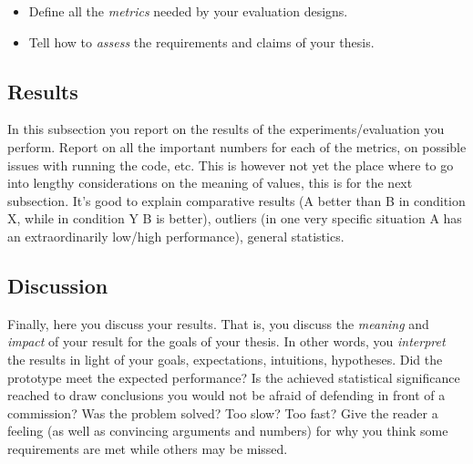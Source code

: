 \begin{itemize}
\item[\Square] Define all the \emph{metrics} needed by your evaluation designs.
\item[\Square] Tell how to \emph{assess} the requirements and claims of your thesis.
\end{itemize}


\subsection{Results}
In this subsection you report on the results of the experiments/evaluation you perform. Report on all the important numbers for each of the metrics, on possible issues with running the code, etc. This is however not yet the place where to go into lengthy considerations on the meaning of values, this is for the next subsection. It's good to explain comparative results (A better than B in condition X, while in condition Y B is better), outliers (in one very specific situation A has an extraordinarily low/high performance), general statistics.

\subsection{Discussion}
Finally, here you discuss your results. That is, you discuss the \emph{meaning} and \emph{impact} of your result for the goals of your thesis. In other words, you \emph{interpret} the results in light of your goals, expectations, intuitions, hypotheses. Did the prototype meet the expected performance? Is the achieved statistical significance reached to draw conclusions you would not be afraid of defending in front of a commission? Was the problem solved? Too slow? Too fast? Give the reader a feeling (as well as convincing arguments and numbers) for why you think some requirements are met while others may be missed. 
